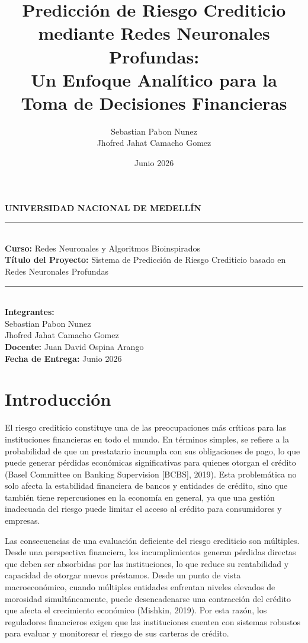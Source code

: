 \documentclass[12pt,a4paper]{article}
\title{\textbf{Predicci\'on de Riesgo Crediticio mediante Redes Neuronales Profundas: \\ Un Enfoque Anal\'itico para la Toma de Decisiones Financieras}}
\author{Sebastian Pabon Nunez \\ Jhofred Jahat Camacho Gomez}
\date{Junio 2026}
\begin{document}
\begin{titlepage}
    \centering
    \vspace*{3cm}

    {\LARGE\textbf{UNIVERSIDAD NACIONAL DE MEDELLÍN}}\\[1.5cm]

    \rule{\textwidth}{0.5pt}\\[0.8cm]
    {\Large\textbf{Curso:}} Redes Neuronales y Algoritmos Bioinspirados\\[0.5cm]
    {\Large\textbf{Título del Proyecto:}} Sistema de Predicción de Riesgo Crediticio basado en Redes Neuronales Profundas\\[0.5cm]
    \rule{\textwidth}{0.5pt}\\[1.5cm]

    {\Large\textbf{Integrantes:}}\\[0.3cm]
    {\large Sebastian Pabon Nunez\\[0.1cm] Jhofred Jahat Camacho Gomez}\\[1.5cm]

    {\Large\textbf{Docente:}} Juan David Ospina Arango\\[0.5cm]
    {\Large\textbf{Fecha de Entrega:}} Junio 2026

    \vfill
\end{titlepage}

\section{Introducción}

El riesgo crediticio constituye una de las preocupaciones más críticas para las instituciones financieras en todo el mundo. En términos simples, se refiere a la probabilidad de que un prestatario incumpla con sus obligaciones de pago, lo que puede generar pérdidas económicas significativas para quienes otorgan el crédito (Basel Committee on Banking Supervision [BCBS], 2019). Esta problemática no solo afecta la estabilidad financiera de bancos y entidades de crédito, sino que también tiene repercusiones en la economía en general, ya que una gestión inadecuada del riesgo puede limitar el acceso al crédito para consumidores y empresas.

Las consecuencias de una evaluación deficiente del riesgo crediticio son múltiples. Desde una perspectiva financiera, los incumplimientos generan pérdidas directas que deben ser absorbidas por las instituciones, lo que reduce su rentabilidad y capacidad de otorgar nuevos préstamos. Desde un punto de vista macroeconómico, cuando múltiples entidades enfrentan niveles elevados de morosidad simultáneamente, puede desencadenarse una contracción del crédito que afecta el crecimiento económico (Mishkin, 2019). Por esta razón, los reguladores financieros exigen que las instituciones cuenten con sistemas robustos para evaluar y monitorear el riesgo de sus carteras de crédito.
\end{document}
